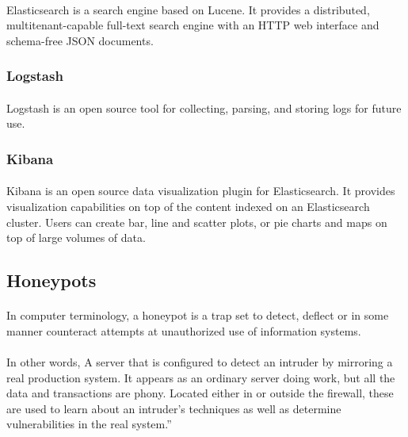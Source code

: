 \documentclass{report}
\begin{document}
\paragraph{}
Elasticsearch is a search engine based on Lucene. It provides a distributed, multitenant-capable full-text search engine with an HTTP web interface and schema-free JSON documents.

\subsubsection{Logstash}

\paragraph{}
Logstash is an open source tool for collecting, parsing, and storing logs for future use.

\subsubsection{Kibana}

\paragraph{}
Kibana is an open source data visualization plugin for Elasticsearch. It provides visualization capabilities on top of the content indexed on an Elasticsearch cluster. Users can create bar, line and scatter plots, or pie charts and maps on top of large volumes of data.

\subsection{Honeypots}

\paragraph{}
In computer terminology, a honeypot is a trap set to detect, deflect or in some manner counteract attempts at unauthorized use of information systems.

\paragraph{}
In other words, A server that is configured to detect an intruder by mirroring a real production system. It appears as an ordinary server doing work, but all the data and transactions are phony. Located either in or outside the firewall, these are used to learn about an intruder’s techniques as well as determine vulnerabilities in the real system.”
\end{document}
